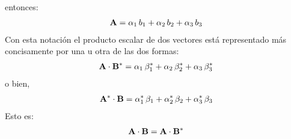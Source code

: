 entonces:
\begin{align*}
    \vb{A} = \alpha_{1} \, b_{1} + \alpha_{2} \, b_{2} + \alpha_{3} \, b_{3}
\end{align*}
Con esta notación el producto escalar de dos vectores está representado más concisamente por una u otra de las dos formas:
\begin{align}
    \vb{A} \cdot \vb{B}^{*} = \alpha_{1} \, \beta_{1}^{*} + \alpha_{2} \, \beta_{2}^{*} + \alpha_{3} \, \beta_{3}^{*}
    \label{eq:ecuacion_01_50}
\end{align}
o bien,
\begin{align*}
    \vb{A}^{*} \cdot \vb{B} = \alpha_{1}^{*} \, \beta_{1} + \alpha_{2}^{*} \, \beta_{2} + \alpha_{3}^{*} \, \beta_{3}   
\end{align*}
Esto es:
\begin{align*}
    \vb{A} \cdot \vb{B} = \vb{A} \cdot \vb{B}^{*}
\end{align*}

\newpage

